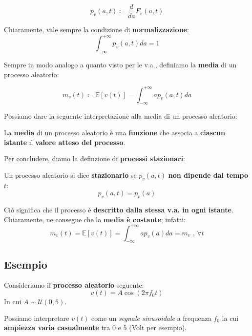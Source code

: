 \begin{definition}
    \[
        p_v(a,t) \coloneqq \frac{d}{da} F_v(a,t)
    \] 
\end{definition}

Chiaramente, vale sempre la condizione di \textbf{normalizzazione}:
\[
    \int_{-\infty}^{+\infty} p_v (a,t) da = 1
\]

Sempre in modo analogo a quanto visto per le v.a., definiamo la
\textbf{media} di un processo aleatorio:

\begin{definition}
    \[
        m_v(t) \coloneqq \mathbb{E}[v(t)] = \int_{-\infty}^{+\infty} a p_v(a,t) da
    \] 
\end{definition}

Possiamo dare la seguente interpretazione alla media di un processo aleatorio:

\begin{remark}
    La \textbf{media} di un processo aleatorio è una \textbf{funzione}
    che associa a \textbf{ciascun istante} il \textbf{valore atteso del processo}.
\end{remark}

Per concludere, diamo la definzione di \textbf{processi stazionari}:

\begin{definition}
    Un processo aleatorio si dice \textbf{stazionario} se $p_v(a,t)$
    \textbf{non dipende dal tempo} $t$:
    \[
        p_v(a,t) = p_v(a)
    \] 
\end{definition}

Ciò significa che il processo è \textbf{descritto dalla stessa v.a. in ogni istante}.
Chiaramente, ne consegue che la \textbf{media è costante}; infatti:
\[
    m_v(t) = \mathbb{E}[v(t)] = \int_{-\infty}^{+\infty} a p_v(a) da = m_v \text{ , }\forall t
\]

\subsection{Esempio}

Consideriamo il \textbf{processo aleatorio} seguente:
\[
    v(t) = A \cos(2\pi f_{0}t)
\]
In cui $A\sim \mathcal{U}(0,5)$.

\begin{remark}
    Possiamo interpretare $v(t)$ come un \textit{segnale sinusoidale} a
    frequenza $f_{0}$ la cui \textbf{ampiezza varia casualmente} tra 
    $0$ e $5$ (Volt per esempio).
\end{remark}

